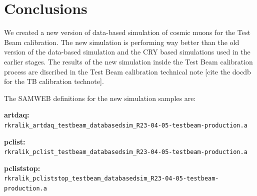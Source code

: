 \documentclass[12pt]{article}
\begin{document}
\section{Conclusions}
We created a new version of data-based simulation of cosmic muons for the Test Beam calibration. The new simulation is performing way better than the old version of the data-based simulation and the CRY based simulations used in the earlier stages. The results of the new simulation inside the Test Beam calibration process are discribed in the Test Beam calibration technical note [cite the docdb for the TB calibration technote].

The SAMWEB definitions for the new simulation samples are:

\textbf{artdaq:}\\
\texttt{rkralik\_artdaq\_testbeam\_databasedsim\_R23-04-05-testbeam-production.a}

\textbf{pclist:}\\
\texttt{rkralik\_pclist\_testbeam\_databasedsim\_R23-04-05-testbeam-production.a}

\textbf{pcliststop:}\\
\texttt{rkralik\_pcliststop\_testbeam\_databasedsim\_R23-04-05-testbeam-production.a}



\end{document}
